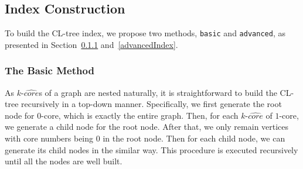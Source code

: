 \subsection{Index Construction}
\label{indexConstruction}
To build the CL-tree index, we propose two methods, {\tt basic} and {\tt advanced},
as presented in Section~\ref{basicIndex} and~\ref{advancedIndex}.

\subsubsection{The Basic Method}
\label{basicIndex}
As $k$-$\widehat {core}$s of a graph are nested naturally,
it is straightforward to build the CL-tree recursively in a top-down manner.
Specifically, we first generate the root node for $0$-core, which is exactly the entire graph.
Then, for each $k$-$\widehat {core}$ of $1$-core, we generate a child node for the root node.
After that, we only remain vertices with core numbers being $0$ in the root node.
Then for each child node, we can generate its child nodes in the similar way.
This procedure is executed recursively until all the nodes are well built.



